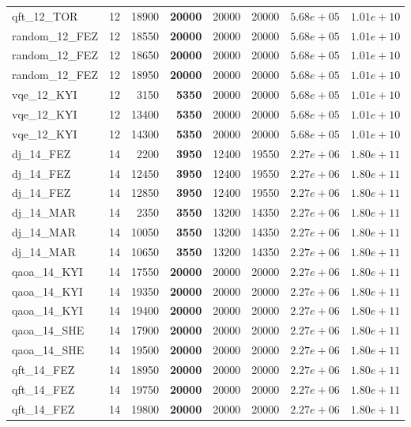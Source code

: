 \begin{table}[ht!]
\begin{tabular}{l c r r r r r r}
qft\_12\_TOR & 12 & 18900 & \textbf{20000} & 20000 & 20000 & $5.68e+05$ & $1.01e+10$ \\
random\_12\_FEZ & 12 & 18550 & \textbf{20000} & 20000 & 20000 & $5.68e+05$ & $1.01e+10$ \\
random\_12\_FEZ & 12 & 18650 & \textbf{20000} & 20000 & 20000 & $5.68e+05$ & $1.01e+10$ \\
random\_12\_FEZ & 12 & 18950 & \textbf{20000} & 20000 & 20000 & $5.68e+05$ & $1.01e+10$ \\
vqe\_12\_KYI & 12 & 3150 & \textbf{5350} & 20000 & 20000 & $5.68e+05$ & $1.01e+10$ \\
vqe\_12\_KYI & 12 & 13400 & \textbf{5350} & 20000 & 20000 & $5.68e+05$ & $1.01e+10$ \\
vqe\_12\_KYI & 12 & 14300 & \textbf{5350} & 20000 & 20000 & $5.68e+05$ & $1.01e+10$ \\
dj\_14\_FEZ & 14 & 2200 & \textbf{3950} & 12400 & 19550 & $2.27e+06$ & $1.80e+11$ \\
dj\_14\_FEZ & 14 & 12450 & \textbf{3950} & 12400 & 19550 & $2.27e+06$ & $1.80e+11$ \\
dj\_14\_FEZ & 14 & 12850 & \textbf{3950} & 12400 & 19550 & $2.27e+06$ & $1.80e+11$ \\
dj\_14\_MAR & 14 & 2350 & \textbf{3550} & 13200 & 14350 & $2.27e+06$ & $1.80e+11$ \\
dj\_14\_MAR & 14 & 10050 & \textbf{3550} & 13200 & 14350 & $2.27e+06$ & $1.80e+11$ \\
dj\_14\_MAR & 14 & 10650 & \textbf{3550} & 13200 & 14350 & $2.27e+06$ & $1.80e+11$ \\
qaoa\_14\_KYI & 14 & 17550 & \textbf{20000} & 20000 & 20000 & $2.27e+06$ & $1.80e+11$ \\
qaoa\_14\_KYI & 14 & 19350 & \textbf{20000} & 20000 & 20000 & $2.27e+06$ & $1.80e+11$ \\
qaoa\_14\_KYI & 14 & 19400 & \textbf{20000} & 20000 & 20000 & $2.27e+06$ & $1.80e+11$ \\
qaoa\_14\_SHE & 14 & 17900 & \textbf{20000} & 20000 & 20000 & $2.27e+06$ & $1.80e+11$ \\
qaoa\_14\_SHE & 14 & 19500 & \textbf{20000} & 20000 & 20000 & $2.27e+06$ & $1.80e+11$ \\
qft\_14\_FEZ & 14 & 18950 & \textbf{20000} & 20000 & 20000 & $2.27e+06$ & $1.80e+11$ \\
qft\_14\_FEZ & 14 & 19750 & \textbf{20000} & 20000 & 20000 & $2.27e+06$ & $1.80e+11$ \\
qft\_14\_FEZ & 14 & 19800 & \textbf{20000} & 20000 & 20000 & $2.27e+06$ & $1.80e+11$ \\

\end{tabular}
\end{table}
